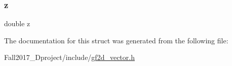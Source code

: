 \mbox{\label{struct_vector4_d_ab3e6ed577a7c669c19de1f9c1b46c872}} 
\subsubsection{\texorpdfstring{z}{z}}
{\footnotesize\ttfamily double z}



The documentation for this struct was generated from the following file\+:\begin{DoxyCompactItemize}
\item 
Fall2017\+\_\+Dproject/include/\hyperlink{gf2d__vector_8h}{gf2d\+\_\+vector.\+h}\end{DoxyCompactItemize}
